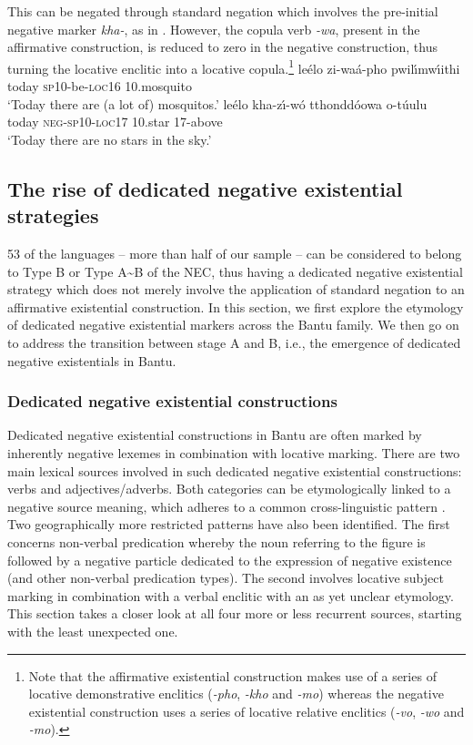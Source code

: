\documentclass[output=paper]{langscibook}
\begin{document}
This can be negated through standard negation which
involves the pre-initial negative marker \textit{kha-}, as in
. However, the copula verb \textit{-wa}, present in the
affirmative construction, is reduced to zero in the negative construction,
thus turning the locative enclitic into a locative copula.\footnote{Note
that the affirmative existential construction makes use of a series of
locative demonstrative enclitics (\textit{-pho}, \textit{-kho} and
\textit{-mo}) whereas the negative existential construction uses a series
of locative relative enclitics (\textit{-vo}, \textit{-wo} and
\textit{-mo}).} \ea\label{ex:shangaji-mosquito-star}
\ea\label{ex:shangaji-mosquito} \gll le{\'e}lo zi-wa{\'a}-pho
pwil{\'\i}mw{\'\i}ithi\\ today \textsc{sp}10-be-\textsc{loc}16
10.mosquito\\ \glt `Today there are (a lot of) mosquitos.'
\ex\label{ex:shangaji-star} \gll le{\'e}lo kha-z{\'\i}-w{\'o}
tthondd{\'o}owa o-t{\'u}ulu\\ today \textsc{neg-sp10-loc17} 10.star
17-above\\ \glt `Today there are no stars in the sky.' \z\z

\subsection{The rise of dedicated negative existential
strategies}\label{sec:1:5.2} 53 of the languages -- more than half of our
sample -- can be considered to belong to Type B or Type A{\textasciitilde}B
of the NEC, thus having a dedicated negative existential strategy which
does not merely involve the application of standard negation to an
affirmative existential construction. In this section, we first explore the
etymology of dedicated negative existential markers across the Bantu
family. We then go on to address the transition between stage A and B,
i.e., the emergence of dedicated negative existentials in Bantu. 

\subsubsection{Dedicated negative existential
constructions}\label{sec:1:5.2.1} Dedicated negative existential
constructions in Bantu are often marked by inherently negative lexemes in
combination with locative marking. There are two main lexical sources
involved in such dedicated negative existential constructions: verbs and
adjectives\slash adverbs. Both categories can be etymologically linked to a
negative source meaning, which adheres to a common cross-linguistic pattern
\citep{Veselinova2013}. Two geographically more restricted patterns have
also been identified. The first concerns non-verbal predication whereby
the noun referring to the figure is followed by a negative particle
dedicated to the expression of negative existence (and other non-verbal
predication types). The second involves locative subject marking in
combination with a verbal enclitic with an as yet unclear etymology. This
section takes a closer look at all four more or less recurrent sources, starting with the least
unexpected one.
\end{document}
